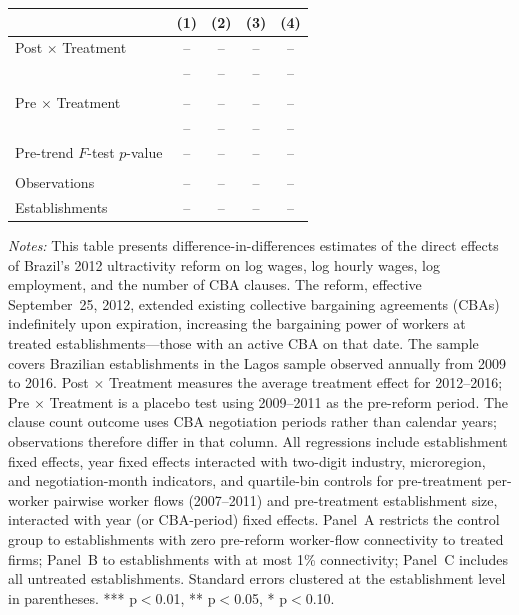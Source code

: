 \documentclass[12pt,letterpaper]{article}
\begin{document}
\begin{table}[]
\begin{threeparttable}
\begin{tabular}{lcccc}
 & (1) & (2) & (3) & (4) \\
\midrule
Post $\times$ Treatment & -- & -- & -- & -- \\
  & -- & -- & -- & -- \\
  &  &  &  & \\
Pre $\times$ Treatment & -- & -- & -- & -- \\
  & -- & -- & -- & -- \\
Pre-trend $F$-test $p$-value & -- & -- & -- & -- \\
  &  &  &  & \\
Observations & -- & -- & -- & -- \\
Establishments & -- & -- & -- & -- \\
\bottomrule
\end{tabular}
\scriptsize
\begin{tablenotes}
\item \textit{Notes:} This table presents difference-in-differences estimates of the direct effects of Brazil's 2012 ultractivity reform on log wages, log hourly wages, log employment, and the number of CBA clauses. The reform, effective September~25, 2012, extended existing collective bargaining agreements (CBAs) indefinitely upon expiration, increasing the bargaining power of workers at treated establishments---those with an active CBA on that date. The sample covers Brazilian establishments in the Lagos sample observed annually from 2009 to 2016. Post $\times$ Treatment measures the average treatment effect for 2012--2016; Pre $\times$ Treatment is a placebo test using 2009--2011 as the pre-reform period. The clause count outcome uses CBA negotiation periods rather than calendar years; observations therefore differ in that column. All regressions include establishment fixed effects, year fixed effects interacted with two-digit industry, microregion, and negotiation-month indicators, and quartile-bin controls for pre-treatment per-worker pairwise worker flows (2007--2011) and pre-treatment establishment size, interacted with year (or CBA-period) fixed effects. Panel~A restricts the control group to establishments with zero pre-reform worker-flow connectivity to treated firms; Panel~B to establishments with at most 1\% connectivity; Panel~C includes all untreated establishments. Standard errors clustered at the establishment level in parentheses. *** p$<$0.01, ** p$<$0.05, * p$<$0.10.
\end{tablenotes}
\end{threeparttable}
\end{table}
\end{document}
